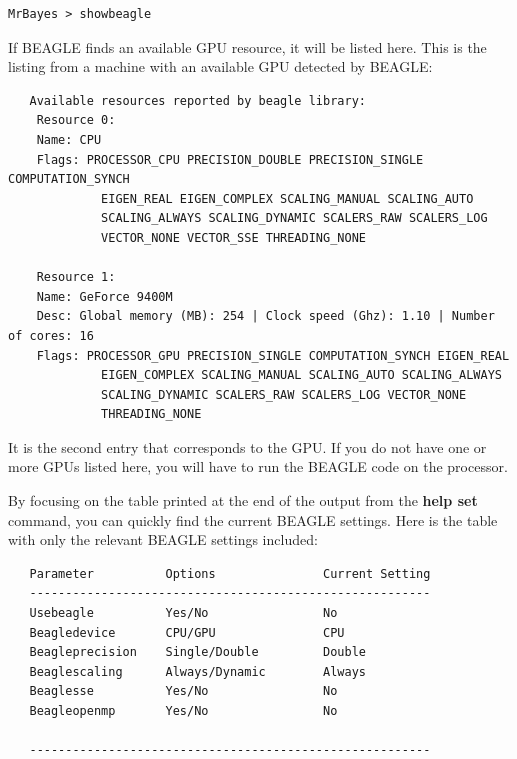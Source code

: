 \documentclass[12pt]{book}
\begin{document}
\small
\begin{verbatim}
MrBayes > showbeagle
\end{verbatim}
\normalsize

If BEAGLE finds an available GPU resource, it will be listed here. This is the listing from a
machine with an available GPU detected by BEAGLE:

\footnotesize
\begin{singlespacing}
\begin{verbatim}
   Available resources reported by beagle library:
	Resource 0:
	Name: CPU
	Flags: PROCESSOR_CPU PRECISION_DOUBLE PRECISION_SINGLE COMPUTATION_SYNCH
             EIGEN_REAL EIGEN_COMPLEX SCALING_MANUAL SCALING_AUTO
             SCALING_ALWAYS SCALING_DYNAMIC SCALERS_RAW SCALERS_LOG
             VECTOR_NONE VECTOR_SSE THREADING_NONE

	Resource 1:
	Name: GeForce 9400M
	Desc: Global memory (MB): 254 | Clock speed (Ghz): 1.10 | Number of cores: 16
	Flags: PROCESSOR_GPU PRECISION_SINGLE COMPUTATION_SYNCH EIGEN_REAL
             EIGEN_COMPLEX SCALING_MANUAL SCALING_AUTO SCALING_ALWAYS
             SCALING_DYNAMIC SCALERS_RAW SCALERS_LOG VECTOR_NONE
             THREADING_NONE
\end{verbatim}
\end{singlespacing}
\normalsize

It is the second entry that corresponds to the GPU. If you do not have one or more GPUs listed
here, you will have to run the BEAGLE code on the processor.

By focusing on the table printed at the end of the output from the \textbf{help set} command, you
can quickly find the current BEAGLE settings. Here is the table with only the relevant BEAGLE
settings included:

\footnotesize
\begin{singlespacing}
\begin{verbatim}
   Parameter          Options               Current Setting
   --------------------------------------------------------
   Usebeagle          Yes/No                No             
   Beagledevice       CPU/GPU               CPU            
   Beagleprecision    Single/Double         Double         
   Beaglescaling      Always/Dynamic        Always         
   Beaglesse          Yes/No                No             
   Beagleopenmp       Yes/No                No             
                                                           
   --------------------------------------------------------
\end{verbatim}
\end{singlespacing}
\normalsize
\end{document}

